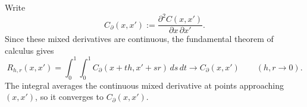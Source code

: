 \documentclass[11pt,letterpaper]{article}
\begin{document}

Write
\[
  C_{\partial}(x,x'):=\frac{\partial^2 C(x,x')}{\partial x\,\partial x'}.
\]
Since these mixed derivatives are continuous, the fundamental theorem of
calculus gives
\[
  R_{h,r}(x,x')
  =\int_0^1\!\int_0^1 C_{\partial}(x+th,x'+sr)\,ds\,dt
  \longrightarrow C_{\partial}(x,x')\qquad(h,r\to0).
\]
The integral averages the continuous mixed derivative at points approaching
$(x,x')$, so it converges to $C_{\partial}(x,x')$.

\end{document}
